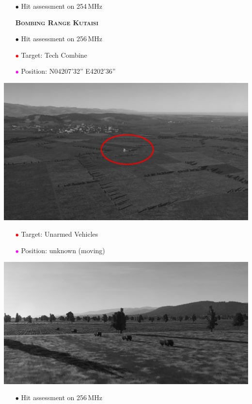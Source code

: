 \documentclass[a4paper,12pt,dvipsnames]{letter}
\newcommand{\Deg}{\textdegree{}}
\newcommand{\DMS}[3]{#1\Deg#2'#3''}
\newcommand{\myHead}[1]{{\LARGE\textsc{\textbf{#1}}}}
\newcommand{\bi}{\textcolor{ProcessBlue}{$\bullet$\;}}
\newcommand{\ri}{\textcolor{Red}{$\bullet$\;}}
\newcommand{\mi}{\textcolor{Magenta}{$\bullet$\;}}
\begin{document}
{\begin{center}
\end{center}
\begin{itemize}
 \item[\bi] Hit assessment on 254\,MHz
\end{itemize}
%
\newpage
\begin{itemize}
 \item[] \myHead{Bombing Range Kutaisi}
 \item[\bi] Hit assessment on 256\,MHz
 \item[\ri] Target: Tech Combine
 \item[\mi] Position: N\DMS{042}{07}{32} E\DMS{42}{02}{36}
\end{itemize}
\begin{center}
 \includegraphics[width=0.7\linewidth]{../gimp/Range_Kutaisi_Pic1.png}
\end{center}
\begin{itemize}
 \item[\ri] Target: Unarmed Vehicles
 \item[\mi] Position: unknown (moving)
\end{itemize}
\begin{center}
 \includegraphics[width=0.7\linewidth]{../gimp/Range_Kutaisi_Mobile.png}
\end{center}
\begin{itemize}
 \item[\bi] Hit assessment on 256\,MHz
\end{itemize}
}
\end{document}
